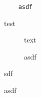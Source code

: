 \documentclass[11pt]{article}
\begin{document}
  \listofcodesnippets
  \listofasdfs
\begin{codesnippet}[ht]
  \begin{lstlisting}
    asdf
  \end{lstlisting}
  \caption{test}
\end{codesnippet}

\begin{figure}
	text
	\caption{asdf}
\end{figure}

\begin{asdf}
	sdf
	\caption{asdf}
\end{asdf}
\end{document}
